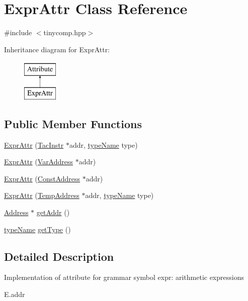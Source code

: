 \hypertarget{class_expr_attr}{}\section{Expr\+Attr Class Reference}
\label{class_expr_attr}


{\ttfamily \#include $<$tinycomp.\+hpp$>$}

Inheritance diagram for Expr\+Attr\+:\begin{figure}[H]
\begin{center}
\leavevmode
\includegraphics[height=2.000000cm]{class_expr_attr}
\end{center}
\end{figure}
\subsection*{Public Member Functions}
\begin{DoxyCompactItemize}
\item 
\hyperlink{class_expr_attr_a9c7b01b5546a7ad4550915b2004bd10a}{Expr\+Attr} (\hyperlink{class_tac_instr}{Tac\+Instr} $\ast$addr, \hyperlink{tinycomp_8h_aca554671f4620139c1393f96d2af74bc}{type\+Name} type)
\item 
\hyperlink{class_expr_attr_a7362196f3e62587f89134e23b8ee40fc}{Expr\+Attr} (\hyperlink{class_var_address}{Var\+Address} $\ast$addr)
\item 
\hyperlink{class_expr_attr_af2cb2432b6971074b082934a1065aaa0}{Expr\+Attr} (\hyperlink{class_const_address}{Const\+Address} $\ast$addr)
\item 
\hyperlink{class_expr_attr_a61e2a36f551af4024b31c58b1185d7d2}{Expr\+Attr} (\hyperlink{class_temp_address}{Temp\+Address} $\ast$addr, \hyperlink{tinycomp_8h_aca554671f4620139c1393f96d2af74bc}{type\+Name} type)
\item 
\hyperlink{class_address}{Address} $\ast$ \hyperlink{class_expr_attr_aec4263aec2979831b898773b0910bc95}{get\+Addr} ()
\item 
\hyperlink{tinycomp_8h_aca554671f4620139c1393f96d2af74bc}{type\+Name} \hyperlink{class_expr_attr_a17c309d7036192a6d15ebe3388dc0f34}{get\+Type} ()
\end{DoxyCompactItemize}


\subsection{Detailed Description}
Implementation of attribute for grammar symbol expr\+: arithmetic expressions
\begin{DoxyItemize}
\item E.\+addr 
\end{DoxyItemize}

